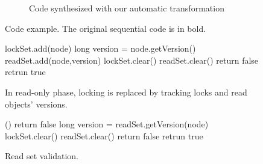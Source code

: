 \begin{figure*}
\begin{center}
\begin{subfigure}{.49\textwidth}
\begin{algorithmic}[1]{}
{			\EndFunction
			}
		\end{algorithmic}
		\caption{ Code synthesized with our
		automatic transformation}\label{figure:transformation:after}
	\end{subfigure}
	\end{center}
	\caption{Code example. 
	The original sequential code
	is in bold.
			\label{figure:transformation}}
\end{figure*}

\begin{figure}
\begin{algorithmic}[1]{}
		{\ttfamily
		\State lockSet.add(node) \label{code:lockedSet:add}
			\State long version = node.getVersion() \label{code:track:getVersion}
			\State readSet.add(node,version)  
				\State lockSet.clear()
				\State readSet.clear()
				\State return false \label{code:track:returnFalse}
			\EndIf
			\State retrun true
		\EndFunction
		}
\end{algorithmic}
\caption{ In read-only phase, locking is replaced by 
tracking locks and read
objects' versions.
\label{figure::track}}
\end{figure}

\begin{figure}
\begin{algorithmic}[1]{}
		{\ttfamily
		()
				\State return false
			\EndIf
			\State long version = readSet.getVersion(node)
				\State lockSet.clear()
				\State readSet.clear()
				\State return false
			\EndIf
		\EndFor
		\State retrun true
		\EndFunction
		}
\end{algorithmic}
\caption{Read set validation.\label{figure::validate}}
\end{figure}


